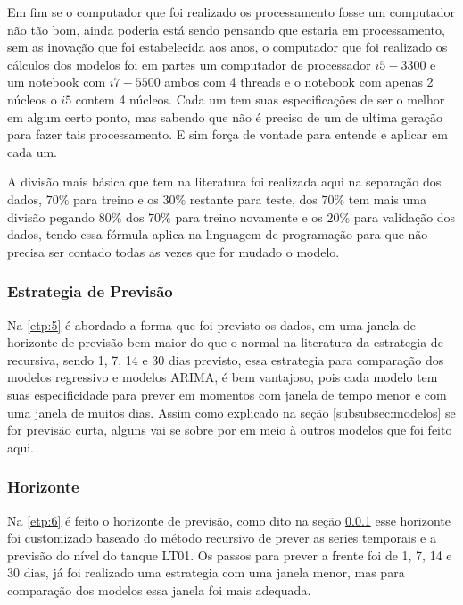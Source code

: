 Em fim se o computador que foi realizado os processamento fosse um computador não tão bom, ainda poderia está sendo pensando que estaria em processamento, sem as inovação que foi estabelecida aos anos, o computador que foi realizado os cálculos dos modelos foi em partes um computador de processador $i5-3300$ e um notebook com $i7-5500$ ambos com 4 threads e o notebook com apenas 2 núcleos o $i5$ contem 4 núcleos. Cada um tem suas especificações de ser o melhor em algum certo ponto, mas sabendo que não é preciso de um de ultima geração para fazer tais processamento. E sim força de vontade para entende e aplicar em cada um.

A divisão mais básica que tem na literatura foi realizada aqui na separação dos dados, $70\%$ para treino e os $30\%$ restante para teste, dos $70\%$ tem mais uma divisão pegando $80\%$ dos $70\%$ para treino novamente e os $20\%$ para validação dos dados, tendo essa fórmula aplica na linguagem de programação para que não precisa ser contado todas as vezes que for mudado o modelo.

\subsubsection{Estrategia de Previs\~ao}\label{subsubsec:est}

Na \ref{etp:5} é abordado a forma que foi previsto os dados, em uma janela de horizonte de previsão bem maior do que o normal na literatura da estrategia de recursiva, sendo 1, 7, 14 e 30 dias previsto, essa estrategia para comparação dos modelos regressivo e modelos ARIMA, é bem vantajoso, pois cada modelo tem suas especificidade para prever em momentos com janela de tempo menor e com uma janela de muitos dias. Assim como explicado na seção \ref{subsubsec:modelos} se for previsão curta, alguns vai se sobre por em meio à outros modelos que foi feito aqui.

\subsubsection{Horizonte}

Na \ref{etp:6} é feito o horizonte de previsão, como dito na seção \ref{subsubsec:est} esse horizonte foi customizado baseado do método recursivo de prever as series temporais e a previsão do nível do tanque LT01. Os passos para prever a frente foi de 1, 7, 14 e 30 dias, já foi realizado uma estrategia com uma janela menor, mas para comparação dos modelos essa janela foi mais adequada.

